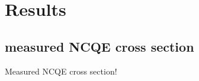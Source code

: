 
%
%

\section{Results}\label{Section_Results}

\subsection{measured NCQE cross section}
\vs\hs Measured NCQE cross section!

\newpage
